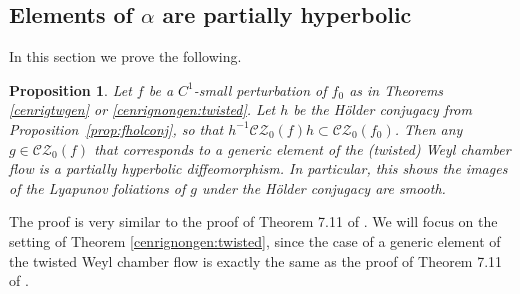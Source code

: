 \documentclass[11pt]{amsart}
\numberwithin{equation}{section}
\newcommand{\CZ}{\mathcal{CZ}}
\theoremstyle{plain}
\newtheorem{prop}[thm]{Proposition}
\begin{document}
 \subsection{Elements of $\alpha$ are partially hyperbolic}\label{alphaph}

In this section we prove the following.

\begin{prop}\label{parthyp}
Let $f$ be a $C^1$-small perturbation of $f_0$ as in Theorems \ref{cenrigtwgen} or \ref{cenrignongen:twisted}. Let \(h\) be the Hölder conjugacy from Proposition~\ref{prop:fholconj},
so that \(h^{-1}\CZ_0(f)h\subset \CZ_0(f_0)\). Then any
$g\in\CZ_0(f)$ that corresponds to a generic element of the (twisted) Weyl
chamber flow is a partially hyperbolic diffeomorphism. In particular, this shows 
the images of the Lyapunov foliations of $g$ under the Hölder conjugacy
are smooth.
\end{prop}
The proof is very similar to the proof of Theorem 7.11 of \cite{Wang}. We will focus on the setting of Theorem \ref{cenrignongen:twisted}, since the case of a generic element of the twisted Weyl chamber flow is exactly the same as the proof of Theorem 7.11 of \cite{Wang}.
\end{document}
